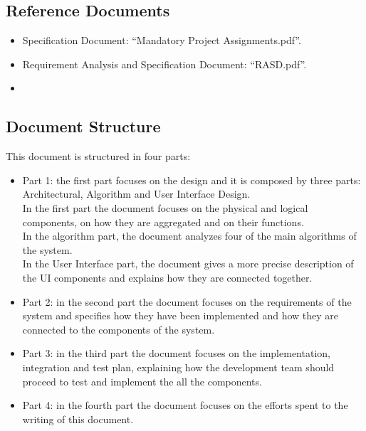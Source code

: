 \subsection{Reference Documents}
\begin{itemize}
\renewcommand\labelitemi{-}
\item
Specification Document: “Mandatory Project Assignments.pdf”.
\item
Requirement Analysis and Specification Document: “RASD.pdf”.
\item
\href{http://ieeexplore.ieee.org/document/5167255/}{\color{Black}{IEEE 1016-2009 - IEEE Standard for Information Technology--Systems Design--Software Design Descriptions.}}
\end{itemize}


\subsection{Document Structure}
This document is structured in four parts:
\begin{itemize}
\item
Part 1: the first part focuses on the design and it is composed by three parts: Architectural, Algorithm and User Interface Design.\\
In the first part the document focuses on the physical and logical components, on how they are aggregated and on their functions.\\
In the algorithm part, the document analyzes four of the main algorithms of the system.\\
In the User Interface part, the document gives a more precise description of the UI components and explains how they are connected together.
\item
Part 2: in the second part the document focuses on the requirements of the system and specifies how they have been implemented and how they are connected to the components of the system.
\item
Part 3: in the third part the document focuses on the implementation, integration and test plan, explaining how the development team should proceed to test and implement the all the components.
\item
Part 4: in the fourth part the document focuses on the efforts spent to the writing of this document.
\end{itemize}